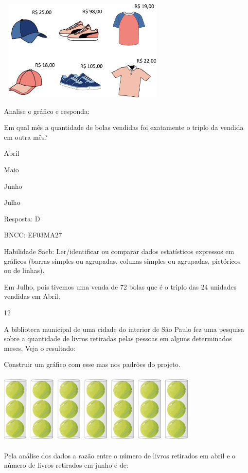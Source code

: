 \begin{escolha}
{\begin{escolha}
{\includegraphics[width=3.36538in,height=2.00040in]{media/image120.png}

Analise o gráfico e responda:

Em qual mês a quantidade de bolas vendidas foi exatamente o triplo da
vendida em outra mês?

\begin{escolha}
\item
  Abril
\item
  Maio
\item
  Junho
\item
  Julho
\end{escolha}

Resposta: D

BNCC: EF03MA27

Habilidade Saeb: Ler/identificar ou comparar dados estatísticos
expressos em gráficos (barras simples ou agrupadas, colunas simples ou
agrupadas, pictóricos ou de linhas).

Em Julho, pois tivemos uma venda de 72 bolas que é o triplo das 24
unidades vendidas em Abril.

\num{12}

A biblioteca municipal de uma cidade do interior de São Paulo fez uma
pesquisa sobre a quantidade de livros retiradas pelas pessoas em alguns
determinados meses. Veja o resultado:

Construir um gráfico com esse mas nos padrões do projeto.

\includegraphics[width=3.93590in,height=1.40906in]{media/image121.png}

Pela análise dos dados a razão entre o número de livros retirados em
abril e o número de livros retirados em junho é de:

}
\end{escolha}}
\end{escolha}
